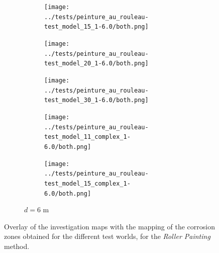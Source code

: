 \begin{theappendices}
\begin{figure}[H]
\begin{subfigure}[t]{\linewidth}
\begin{subfigure}[t]{0.11\linewidth}
				\end{subfigure}
				\hfill
				\begin{subfigure}[t]{0.11\linewidth}
					\texttt{[image: ../tests/peinture\_au\_rouleau-test\_model\_15\_1-6.0/both.png]}
				\end{subfigure}
				\hfill
				\begin{subfigure}[t]{0.11\linewidth}
					\texttt{[image: ../tests/peinture\_au\_rouleau-test\_model\_20\_1-6.0/both.png]}
				\end{subfigure}
				\hfill
				\begin{subfigure}[t]{0.11\linewidth}
					\texttt{[image: ../tests/peinture\_au\_rouleau-test\_model\_30\_1-6.0/both.png]}
				\end{subfigure}
				\hfill
				\begin{subfigure}[t]{0.11\linewidth}
					\texttt{[image: ../tests/peinture\_au\_rouleau-test\_model\_11\_complex\_1-6.0/both.png]}
				\end{subfigure}
				\hfill
				\begin{subfigure}[t]{0.11\linewidth}
					\texttt{[image: ../tests/peinture\_au\_rouleau-test\_model\_15\_complex\_1-6.0/both.png]}
				\end{subfigure}
				\caption{$d = 6$ m}
			\end{subfigure}
			\caption{Overlay of the investigation maps with the mapping of the corrosion zones obtained for the different test worlds, for the \textit{Roller Painting} method.}
			\label{fig:peinture_au_rouleau_resultats}
		\end{figure}


\end{theappendices}
